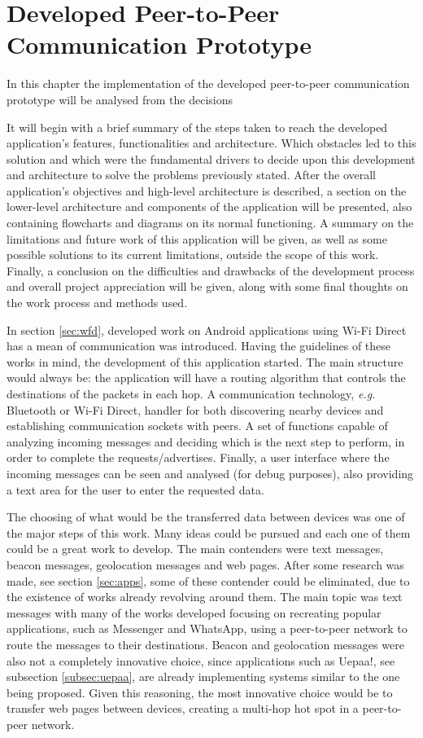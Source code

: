 \chapter{Developed Peer-to-Peer Communication Prototype}
\label{chapter:work}

In this chapter the implementation of the developed peer-to-peer communication prototype will be analysed from the decisions 

It will begin with a brief summary of the steps taken to reach the developed application's features, functionalities and architecture. Which obstacles led to this solution and which were the fundamental drivers to decide upon this development and architecture to solve the problems previously stated. After the overall application's objectives and high-level architecture is described, a section on the lower-level architecture and components of the application will be presented, also containing flowcharts and diagrams on its normal functioning. A summary on the limitations and future work of this application will be given, as well as some possible solutions to its current limitations, outside the scope of this work. Finally, a conclusion on the difficulties and drawbacks of the development process and overall project appreciation will be given, along with some final thoughts on the work process and methods used.

In section \ref{sec:wfd}, developed work on Android applications using Wi-Fi Direct has a mean of communication was introduced. Having the guidelines of these works in mind, the development of this application started. The main structure would always be: the application will have a routing algorithm that controls the destinations of the packets in each hop. A communication technology, \textit{e.g.} Bluetooth or Wi-Fi Direct, handler for both discovering nearby devices and establishing communication sockets with peers. A set of functions capable of analyzing incoming messages and deciding which is the next step to perform, in order to complete the requests/advertises. Finally, a user interface where the incoming messages can be seen and analysed (for debug purposes), also providing a text area for the user to enter the requested data.

The choosing of what would be the transferred data between devices was one of the major steps of this work. Many ideas could be pursued and each one of them could be a great work to develop. The main contenders were text messages, beacon messages, geolocation messages and web pages. After some research was made, see section \ref{sec:apps}, some of these contender could be eliminated, due to the existence of works already revolving around them. The main topic was text messages with many of the works developed focusing on recreating popular applications, such as Messenger and WhatsApp, using a peer-to-peer network to route the messages to their destinations. Beacon and geolocation messages were also not a completely innovative choice, since applications such as Uepaa!, see subsection \ref{subsec:uepaa}, are already implementing systems similar to the one being proposed. Given this reasoning, the most innovative choice would be to transfer web pages between devices, creating a multi-hop hot spot in a peer-to-peer network.

